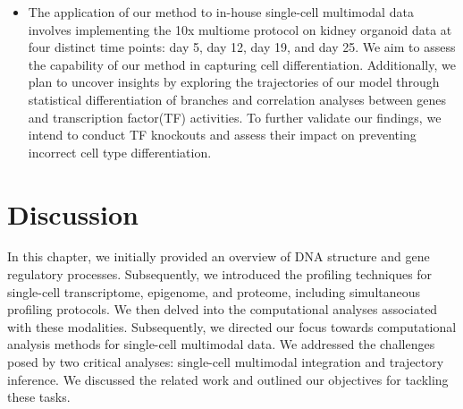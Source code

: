 \begin{itemize}
	\item The application of our method to in-house single-cell multimodal data involves implementing the 10x multiome protocol on kidney organoid data at four distinct time points: day 5, day 12, day 19, and day 25. We aim to assess the capability of our method in capturing cell differentiation. Additionally, we plan to uncover insights by exploring the trajectories of our model through statistical differentiation of branches and correlation analyses between genes and transcription factor(TF) activities. To further validate our findings, we intend to conduct TF knockouts and assess their impact on preventing incorrect cell type differentiation.

\end{itemize}


\section{Discussion}
\label{background:Discussion}
In this chapter, we initially provided an overview of DNA structure and gene regulatory processes. Subsequently, we introduced the profiling techniques for single-cell transcriptome, epigenome, and proteome, including simultaneous profiling protocols. We then delved into the computational analyses associated with these modalities. Subsequently, we directed our focus towards computational analysis methods for single-cell multimodal data. We addressed the challenges posed by two critical analyses: single-cell multimodal integration and trajectory inference. We discussed the related work and outlined our objectives for tackling these tasks.
